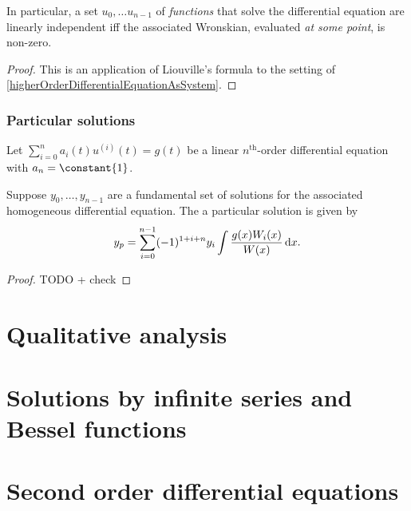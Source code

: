 In particular, a set $u_0, \ldots u_{n-1}$ of \emph{functions} that solve the differential equation are linearly independent iff the associated Wronskian, evaluated \emph{at some point}, is non-zero.
\begin{proof}
This is an application of Liouville's formula to the setting of \ref{higherOrderDifferentialEquationAsSystem}.
\end{proof}

\subsubsection{Particular solutions}
\begin{proposition}
Let $\sum_{i=0}^n a_i(t)u^{(i)}(t) = g(t)$ be a linear $n^\text{th}$-order differential equation with $a_n = \constant{1}$.

Suppose $y_0, \ldots, y_{n-1}$ are a fundamental set of solutions for the associated homogeneous differential equation. The a particular solution is given by
\[ y_p = \sum_{i=0}^{n-1}(-1)^{1+i+n}y_i \int \frac{g(x)W_i(x)}{W(x)}\operatorname{d \!}{x}. \]
\end{proposition}
\begin{proof}
TODO + check
\end{proof}


\section{Qualitative analysis}

\section{Solutions by infinite series and Bessel functions}

\section{Second order differential equations}

